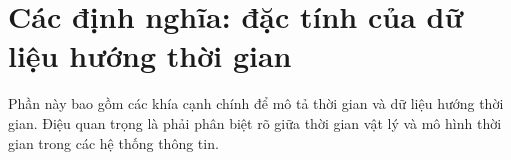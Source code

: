 \section{Các định nghĩa: đặc tính của dữ liệu hướng thời gian}
Phần này bao gồm các khía cạnh chính để mô tả thời gian và dữ liệu hướng thời gian. Điệu quan trọng là phải phân biệt rõ giữa thời gian vật lý và mô hình thời gian trong các hệ thống thông tin.